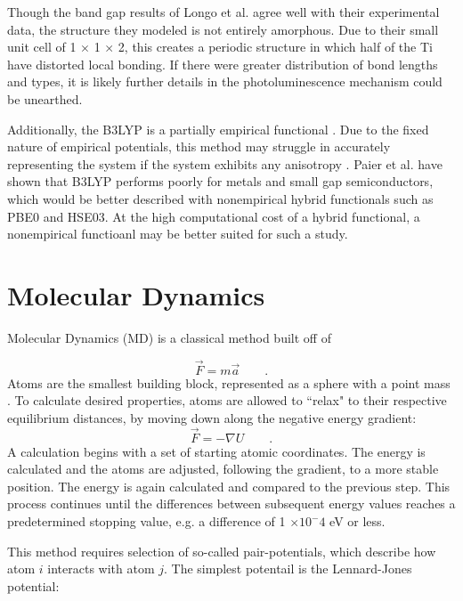 \documentclass[3p,review,12pt]{elsarticle}
\begin{document}
\par

Though the band gap results of Longo et al. agree well with their experimental data, the structure they modeled is not entirely amorphous. Due to their small unit cell of 1 $\times$ 1 $\times$ 2, this creates a periodic structure in which half of the Ti have distorted local bonding. If there were greater distribution of bond lengths and types, it is likely further details in the photoluminescence mechanism could be unearthed.
\par

Additionally, the B3LYP is a partially empirical functional \cite{Paier2007}. Due to the fixed nature of empirical potentials, this method may struggle in accurately representing the system if the system exhibits any anisotropy \cite{Hohl1991}. Paier et al. \cite{Paier2007} have shown that B3LYP performs poorly for metals and small gap semiconductors, which would be better described with nonempirical hybrid functionals such as PBE0 and HSE03. At the high computational cost of a hybrid functional, a nonempirical functioanl may be better suited for such a study.


\section{Molecular Dynamics}

Molecular Dynamics (MD) is a classical method built off of

\begin{equation}
\vec{F}=m\vec{a} \qquad .
\end{equation}
Atoms are the smallest building block, represented as a sphere with a point mass \cite{Lee2012}. To calculate desired properties, atoms are allowed to ``relax" to their respective equilibrium distances, by moving down along the negative energy gradient:
\begin{equation}
\vec{F} = - \nabla U \qquad .
\end{equation}
A calculation begins with a set of starting atomic coordinates. The energy is calculated and the atoms are adjusted, following the gradient, to a more stable position. The energy is again calculated and compared to the previous step. This process continues until the differences between subsequent energy values reaches a predetermined stopping value, e.g. a difference of 1 $\times 10^-4$ eV or less.
\par
This method requires selection of so-called pair-potentials, which describe how atom $i$ interacts with atom $j$. The simplest potentail is the Lennard-Jones potential:
\end{document}
